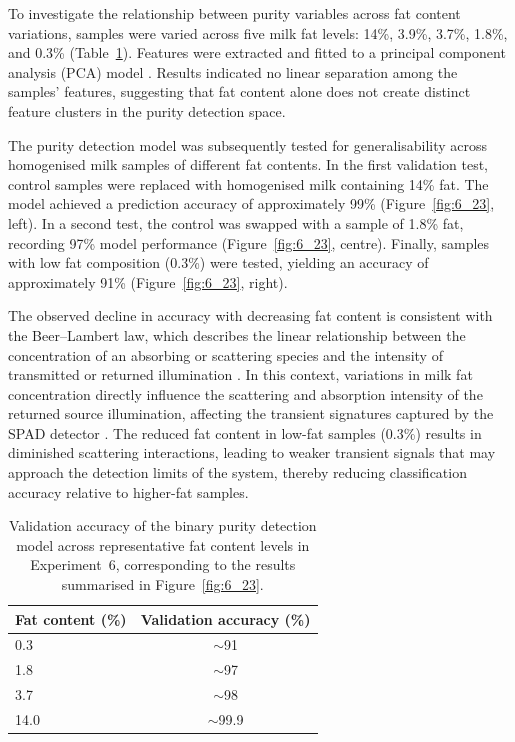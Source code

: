 \documentclass[12pt,a4paper,oneside]{report}
\begin{document}
To investigate the relationship between purity variables across fat content variations, samples were varied across five milk fat levels: 14\%, 3.9\%, 3.7\%, 1.8\%, and 0.3\% (Table~\ref{tab:6_2}). Features were extracted and fitted to a principal component analysis (PCA) model \cite{wold1987,chandra2024}. Results indicated no linear separation among the samples' features, suggesting that fat content alone does not create distinct feature clusters in the purity detection space.

The purity detection model was subsequently tested for generalisability across homogenised milk samples of different fat contents. In the first validation test, control samples were replaced with homogenised milk containing 14\% fat. The model achieved a prediction accuracy of approximately 99\% (Figure~\ref{fig:6_23}, left). In a second test, the control was swapped with a sample of 1.8\% fat, recording 97\% model performance (Figure~\ref{fig:6_23}, centre). Finally, samples with low fat composition (0.3\%) were tested, yielding an accuracy of approximately 91\% (Figure~\ref{fig:6_23}, right).

The observed decline in accuracy with decreasing fat content is consistent with the Beer--Lambert law, which describes the linear relationship between the concentration of an absorbing or scattering species and the intensity of transmitted or returned illumination \cite{holt2016,elachi2021}. In this context, variations in milk fat concentration directly influence the scattering and absorption intensity of the returned source illumination, affecting the transient signatures captured by the SPAD detector \cite{nielsen2013,aernouts2015}. The reduced fat content in low-fat samples (0.3\%) results in diminished scattering interactions, leading to weaker transient signals that may approach the detection limits of the system, thereby reducing classification accuracy relative to higher-fat samples.

\begin{table}[htbp]
    \centering
    \begin{tabular}{lc}
    \toprule
    \textbf{Fat content (\%)} & \textbf{Validation accuracy (\%)} \\
    \midrule
    0.3 & $\sim$91 \\
    1.8 & $\sim$97 \\
    3.7 & $\sim$98 \\
    14.0 & $\sim$99.9 \\
    \bottomrule
    \end{tabular}
    \caption{Validation accuracy of the binary purity detection model across representative fat content levels in Experiment~6, corresponding to the results summarised in Figure~\ref{fig:6_23}.}
    \label{tab:6_2}
\end{table}
\end{document}
